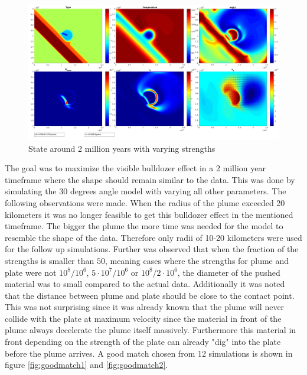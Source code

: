 \documentclass[12pt]{scrreprt}
\begin{document}
\begin{figure}[!ht]
\begin{minipage}[c]{1.0\textwidth}
\begin{minipage}[t]{0.5\textwidth}
		\end{minipage}
		\begin{minipage}[t]{0.5\textwidth}
			\includegraphics[width=1.0\textwidth]{./Snapshots/bulldozer/posleft45/Subductionzonewithblob81posleftslab45s2e7s1e7r20.jpg}
		\end{minipage}
	\end{minipage}
	\caption{State around 2 million years with varying strengths}
	\label{fig:bulldozer45}
\end{figure}
The goal was to maximize the visible bulldozer effect in a 2 million year timeframe where the shape should remain similar to the data. This was done by simulating the 30 degrees angle model with varying all other parameters. The following observations were made. When the radius of the plume exceeded 20 kilometers it was no longer feasible to get this bulldozer effect in the mentioned timeframe. The bigger the plume the more time was needed for the model to resemble the shape of the data. Therefore only radii of 10-20 kilometers were used for the follow up simulations. Further was observed that when the fraction of the strengths is smaller than $50$, meaning cases where the strengths for plume and plate were not $10^8/10^6$, $5\cdot 10^7/10^6$ or $10^8/2\cdot 10^6$, the diameter of the pushed material was to small compared to the actual data. Additionally it was noted that the distance between plume and plate should be close to the contact point. This was not surprising since it was already known that the plume will never collide with the plate at maximum velocity since the material in front of the plume always decelerate the plume itself massively. Furthermore this material in front depending on the strength of the plate can already "dig" into the plate before the plume arrives. A good match chosen from 12 simulations is shown in figure \ref{fig:goodmatch1} and \ref{fig:goodmatch2}.
\end{document}
